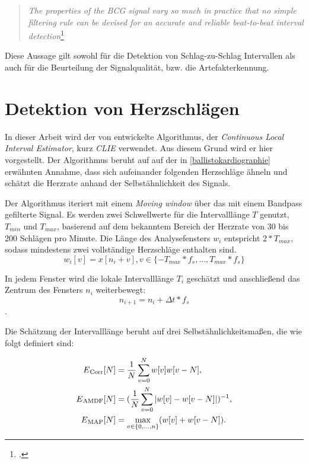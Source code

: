 	\begin{quote}\textit{The properties of the BCG signal vary so much in practice that no simple filtering rule can be devised for an accurate and reliable beat-to-beat interval detection}\footcite{Paalasmaa2015}\end{quote}
	
	Diese Aussage gilt sowohl für die Detektion von Schlag-zu-Schlag Intervallen als auch für die Beurteilung der Signalqualität, bzw. die Artefakterkennung.

\section{Detektion von Herzschlägen}\label{CLIE}

	In dieser Arbeit wird der von \citeauthor{Bruser2013} entwickelte Algorithmus, der \textit{Continuous Local Interval Estimator}, kurz \textit{CLIE} verwendet. Aus diesem Grund wird er hier vorgestellt. Der Algorithmus beruht auf auf der in \ref{ballistokardiographie} erwähnten Annahme, dass sich aufeinander folgenden Herzschläge ähneln und schätzt die Herzrate anhand der Selbstähnlichkeit des Signals.


	Der Algorithmus iteriert mit einem \textit{Moving window} über das mit einem Bandpass gefilterte Signal. Es werden zwei Schwellwerte für die Intervalllänge $T$ genutzt, $T_{min}$ und $T_{max}$, basierend auf dem bekanntem Bereich der Herzrate von 30 bis 200 Schlägen pro Minute. Die Länge des Analysefensters $w_i$ entspricht $2 * T_{max}$, sodass mindestens zwei vollständige Herzschläge enthalten sind.
	\[w_i[v] = x[n_i + v], v \in \{ -T_{max} * f_s, ..., T_{max} * f_s\}\]
	
	In jedem Fenster wird die lokale Intervalllänge $T_i$ geschätzt und anschließend das Zentrum des Fensters $n_i$ weiterbewegt: \[ n_{i+1} = n_i + \Delta t * f_s \].
	
	Die Schätzung der Intervalllänge beruht auf drei Selbstähnlichkeitsmaßen, die wie folgt definiert sind:
	
	\begin{align*}
		E\textsubscript{Corr}[N] &= \frac{1}{N} \sum_{v=0}^{N} w[v]w[v-N],\\
		E\textsubscript{AMDF}[N] &= (\frac{1}{N} \sum_{v=0}^{N} |w[v]-w[v-N]|)^{-1},\\
		E\textsubscript{MAP}[N] &= \max_{v \in \{0,...,n\}}(w[v]+w[v-N]).
	\end{align*}
 	
